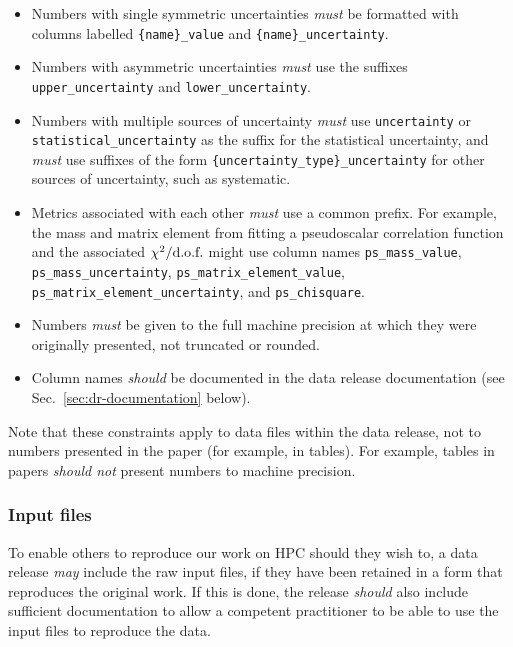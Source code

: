 \documentclass{article}
\newcommand\rfcword[1]{\emph{#1}\xspace}
\newcommand\must{\rfcword{must}}
\newcommand\should{\rfcword{should}}
\newcommand\shouldnot{\rfcword{should not}}
\newcommand\may{\rfcword{may}}
\begin{document}
\begin{itemize}
  \item
        Numbers with single symmetric uncertainties \must be formatted with columns labelled
        \verb|{name}_value| and \verb|{name}_uncertainty|.
  \item
        Numbers with asymmetric uncertainties \must use the suffixes
        \verb|upper_uncertainty| and \verb|lower_uncertainty|.
  \item
        Numbers with multiple sources of uncertainty \must use
        \verb|uncertainty| or \verb|statistical_uncertainty|
        as the suffix for the statistical uncertainty,
        and \must use suffixes of the form
        \verb|{uncertainty_type}_uncertainty|
        for other sources of uncertainty,
        such as systematic.
  \item
        Metrics associated with each other \must use a common prefix.
        For example,
        the mass and matrix element from fitting a pseudoscalar correlation function
        and the associated $\chi^{2}/\textnormal{d.o.f.}$
        might use column names
        \verb|ps_mass_value|,
        \verb|ps_mass_uncertainty|,
        \verb|ps_matrix_element_value|,
        \verb|ps_matrix_element_uncertainty|,
        and \verb|ps_chisquare|.
  \item
        Numbers \must be given to the full machine precision at which they were originally presented,
        not truncated or rounded.
  \item
        Column names \should be documented in the data release documentation
        (see Sec.~\ref{sec:dr-documentation} below).
\end{itemize}

Note that these constraints apply to data files within the data release,
not to numbers presented in the paper
(for example,
in tables).
For example,
tables in papers \shouldnot present numbers to machine precision.

\subsubsection{Input files}

To enable others to reproduce our work on HPC should they wish to,
a data release \may include the raw input files,
if they have been retained in a form that reproduces the original work.
If this is done,
the release \should also include sufficient documentation
to allow a competent practitioner to be able to use the input files to reproduce the data.
\end{document}

